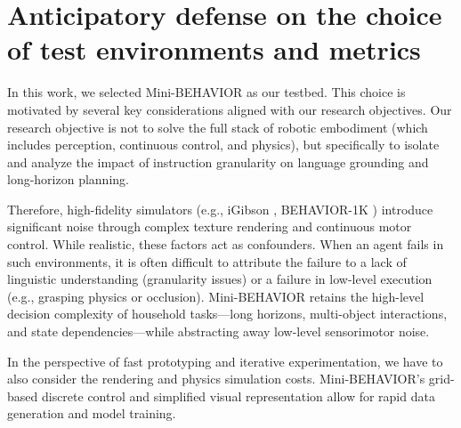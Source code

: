 \section{Anticipatory defense on the choice of test environments and metrics}
\label{app_sec:ant_defense_test_env}




In this work, we selected Mini-BEHAVIOR as our testbed. This choice is motivated by several key considerations aligned with our research objectives. Our research objective is not to solve the full stack of robotic embodiment (which includes perception, continuous control, and physics), but specifically to isolate and analyze the impact of instruction granularity on language grounding and long-horizon planning.

Therefore, high-fidelity simulators (e.g., iGibson \citep{li2022igibson}, BEHAVIOR-1K \citep{DBLP:conf/corl/0002ZWGSMWLLSAH22}) introduce significant noise through complex texture rendering and continuous motor control. While realistic, these factors act as confounders. When an agent fails in such environments, it is often difficult to attribute the failure to a lack of linguistic understanding (granularity issues) or a failure in low-level execution (e.g., grasping physics or occlusion). Mini-BEHAVIOR retains the high-level decision complexity of household tasks—long horizons, multi-object interactions, and state dependencies—while abstracting away low-level sensorimotor noise.

In the perspective of fast prototyping and iterative experimentation, we have to also consider the rendering and physics simulation costs. Mini-BEHAVIOR's grid-based discrete control and simplified visual representation allow for rapid data generation and model training. 

